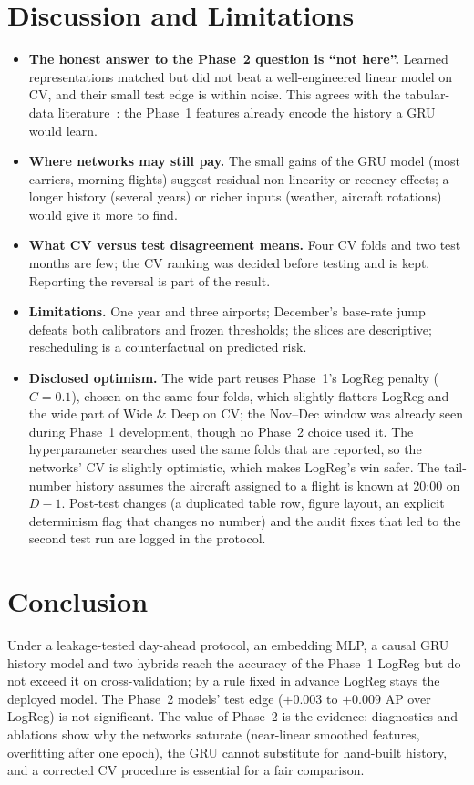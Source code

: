 \documentclass[conference]{IEEEtran}
\begin{document}
\section{Discussion and Limitations}\label{sec:discussion}
\begin{itemize}
\item \textbf{The honest answer to the Phase~2 question is ``not here''.} Learned representations matched but did not beat a well-engineered linear model on CV, and their small test edge is within noise. This agrees with the tabular-data literature~\cite{gorishniy2021revisiting,grinsztajn2022tree}: the Phase~1 features already encode the history a GRU would learn.
\item \textbf{Where networks may still pay.} The small gains of the GRU model (most carriers, morning flights) suggest residual non-linearity or recency effects; a longer history (several years) or richer inputs (weather, aircraft rotations) would give it more to find.
\item \textbf{What CV versus test disagreement means.} Four CV folds and two test months are few; the CV ranking was decided before testing and is kept. Reporting the reversal is part of the result.
\item \textbf{Limitations.} One year and three airports; December's base-rate jump defeats both calibrators and frozen thresholds; the slices are descriptive; rescheduling is a counterfactual on predicted risk.
\item \textbf{Disclosed optimism.} The wide part reuses Phase~1's LogReg penalty ($C=0.1$), chosen on the same four folds, which slightly flatters LogReg and the wide part of Wide \& Deep on CV; the Nov--Dec window was already seen during Phase~1 development, though no Phase~2 choice used it. The hyperparameter searches used the same folds that are reported, so the networks' CV is slightly optimistic, which makes LogReg's win safer. The tail-number history assumes the aircraft assigned to a flight is known at 20:00 on $D-1$. Post-test changes (a duplicated table row, figure layout, an explicit determinism flag that changes no number) and the audit fixes that led to the second test run are logged in the protocol.
\end{itemize}

\section{Conclusion}\label{sec:conclusion}
Under a leakage-tested day-ahead protocol, an embedding MLP, a causal GRU history model and two hybrids reach the accuracy of the Phase~1 LogReg but do not exceed it on cross-validation; by a rule fixed in advance LogReg stays the deployed model. The Phase~2 models' test edge ($+0.003$ to $+0.009$ AP over LogReg) is not significant. The value of Phase~2 is the evidence: diagnostics and ablations show why the networks saturate (near-linear smoothed features, overfitting after one epoch), the GRU cannot substitute for hand-built history, and a corrected CV procedure is essential for a fair comparison.




\end{document}
